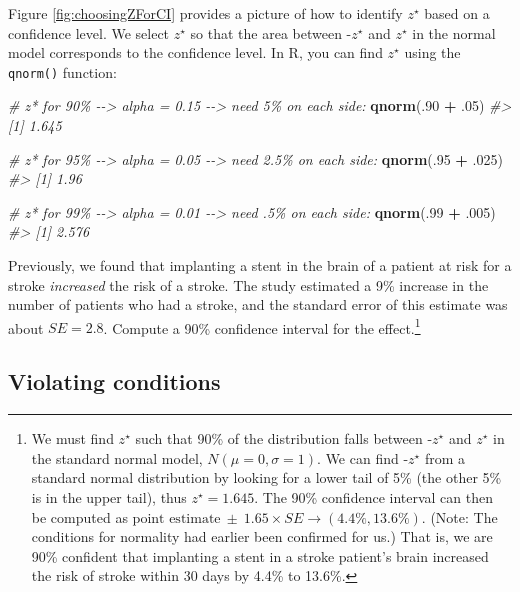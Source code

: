 \documentclass[
  10pt,
  openany]{book}
\newenvironment{Shaded}{\begin{snugshade}}{\end{snugshade}}
\newcommand{\CommentTok}[1]{\textcolor[rgb]{0.56,0.35,0.01}{\textit{#1}}}
\newcommand{\DecValTok}[1]{\textcolor[rgb]{0.00,0.00,0.81}{#1}}
\newcommand{\FunctionTok}[1]{\textcolor[rgb]{0.13,0.29,0.53}{\textbf{#1}}}
\newcommand{\NormalTok}[1]{#1}
\newcommand{\SpecialCharTok}[1]{\textcolor[rgb]{0.81,0.36,0.00}{\textbf{#1}}}
\theoremstyle{definition}
\theoremstyle{definition}
\theoremstyle{definition}
\theoremstyle{definition}
\theoremstyle{remark}
\begin{document}
Figure \ref{fig:choosingZForCI} provides a picture of how to identify \(z^{\star}\) based on a confidence level. We select \(z^{\star}\) so that the area between -\(z^{\star}\) and \(z^{\star}\) in the normal model corresponds to the confidence level. In R, you can find \(z^{\star}\) using the \texttt{qnorm()} function:

\begin{Shaded}
\begin{Highlighting}[]
\CommentTok{\# z* for 90\% {-}{-}\textgreater{} alpha = 0.15 {-}{-}\textgreater{} need 5\% on each side:}
\FunctionTok{qnorm}\NormalTok{(.}\DecValTok{90} \SpecialCharTok{+}\NormalTok{ .}\DecValTok{05}\NormalTok{)}
\CommentTok{\#\textgreater{} [1] 1.645}

\CommentTok{\# z* for 95\% {-}{-}\textgreater{} alpha = 0.05 {-}{-}\textgreater{} need 2.5\% on each side:}
\FunctionTok{qnorm}\NormalTok{(.}\DecValTok{95} \SpecialCharTok{+}\NormalTok{ .}\DecValTok{025}\NormalTok{)}
\CommentTok{\#\textgreater{} [1] 1.96}

\CommentTok{\# z* for 99\% {-}{-}\textgreater{} alpha = 0.01 {-}{-}\textgreater{} need .5\% on each side:}
\FunctionTok{qnorm}\NormalTok{(.}\DecValTok{99} \SpecialCharTok{+}\NormalTok{ .}\DecValTok{005}\NormalTok{)}
\CommentTok{\#\textgreater{} [1] 2.576}
\end{Highlighting}
\end{Shaded}

Previously, we found that implanting a stent in the brain of a patient at risk for a stroke \emph{increased} the risk of a stroke. The study estimated a 9\% increase in the number of patients who had a stroke, and the standard error of this estimate was about \(SE = 2.8%
\). Compute a 90\% confidence interval for the effect.\footnote{We must find \(z^{\star}\) such that 90\% of the distribution falls between -\(z^{\star}\) and \(z^{\star}\) in the standard normal model, \(N(\mu=0, \sigma=1)\). We can find -\(z^{\star}\) from a standard normal distribution by looking for a lower tail of 5\% (the other 5\% is in the upper tail), thus \(z^{\star}=1.645\). The 90\% confidence interval can then be computed as \(\text{point estimate}\ \pm\ 1.65\times SE \to (4.4\%, 13.6\%)\). (Note: The conditions for normality had earlier been confirmed for us.) That is, we are 90\% confident that implanting a stent in a stroke patient's brain increased the risk of stroke within 30 days by 4.4\% to 13.6\%.}

\subsection{Violating conditions}\label{violating-conditions}
\end{document}
